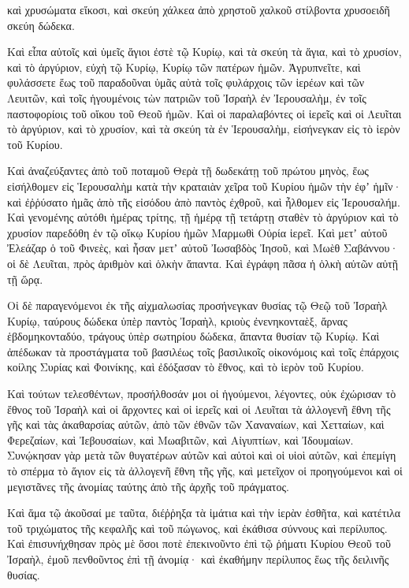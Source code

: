 {καὶ χρυσώματα εἴκοσι, καὶ σκεύη χάλκεα ἀπὸ χρηστοῦ χαλκοῦ στίλβοντα χρυσοειδῆ σκεύη δώδεκα.
\par }{\PP {}Καὶ εἶπα αὐτοῖς καὶ ὑμεῖς ἅγιοι ἐστὲ τῷ Κυρίῳ, καὶ τὰ σκεύη τὰ ἅγια, καὶ τὸ χρυσίον, καὶ τὸ ἀργύριον, εὐχὴ τῷ Κυρίῳ, Κυρίῳ τῶν πατέρων ἡμῶν.
Ἀγρυπνεῖτε, καὶ φυλάσσετε ἕως τοῦ παραδοῦναι ὑμᾶς αὐτὰ τοῖς φυλάρχοις τῶν ἱερέων καὶ τῶν Λευιτῶν, καὶ τοῖς ἡγουμένοις τὼν πατριῶν τοῦ Ἰσραὴλ ἐν Ἰερουσαλὴμ, ἐν τοῖς παστοφορίοις τοῦ οἴκου τοῦ Θεοῦ ἡμῶν.
Καὶ οἱ παραλαβόντες οἱ ἱερεῖς καὶ οἱ Λευῖται τὸ ἀργύριον, καὶ τὸ χρυσίον, καὶ τὰ σκεύη τὰ ἐν Ἱερουσαλὴμ, εἰσήνεγκαν εἰς τὸ ἱερὸν τοῦ Κυρίου.
\par }{\PP {}Καὶ ἀναζεύξαντες ἀπὸ τοῦ ποταμοῦ Θερὰ τῇ δωδεκάτῃ τοῦ πρώτου μηνὸς, ἕως εἰσήλθομεν εἰς Ἱερουσαλὴμ κατὰ τὴν κραταιὰν χεῖρα τοῦ Κυρίου ἡμῶν τὴν ἐφʼ ἡμῖν· καὶ ἐῤῥύσατο ἡμᾶς ἀπὸ τῆς εἰσόδου ἀπὸ παντὸς ἐχθροῦ, καὶ ἦλθομεν εἰς Ἱερουσαλήμ.
Καὶ γενομένης αὐτόθι ἡμέρας τρίτης, τῇ ἡμέρᾳ τῇ τετάρτῃ σταθὲν τὸ ἀργύριον καὶ τὸ χρυσίον παρεδόθη ἐν τῷ οἴκῳ Κυρίου ἡμῶν Μαρμωθὶ Οὐρία ἱερεῖ.
Καὶ μετʼ αὐτοῦ Ἐλεάζαρ ὁ τοῦ Φινεὲς, καὶ ἦσαν μετʼ αὐτοῦ Ἰωσαβδὸς Ἰησοῦ, καὶ Μωὲθ Σαβάννου· οἱ δὲ Λευῖται, πρὸς ἀριθμὸν καὶ ὁλκὴν ἅπαντα.
Καὶ ἐγράφη πᾶσα ἡ ὁλκὴ αὐτῶν αὐτῇ τῇ ὥρᾳ.
\par }{\PP {}Οἱ δὲ παραγενόμενοι ἐκ τῆς αἰχμαλωσίας προσήνεγκαν θυσίας τῷ Θεῷ τοῦ Ἰσραὴλ Κυρίῳ, ταύρους δώδεκα ὑπὲρ παντὸς Ἰσραὴλ,
κριοὺς ἐνενηκονταὲξ, ἄρνας ἑβδομηκονταδύο, τράγους ὑπὲρ σωτηρίου δώδεκα, ἅπαντα θυσίαν τῷ Κυρίῳ.
Καὶ ἀπέδωκαν τὰ προστάγματα τοῦ βασιλέως τοῖς βασιλικοῖς οἰκονόμοις καὶ τοῖς ἐπάρχοις κοίλης Συρίας καὶ Φοινίκης, καὶ ἐδόξασαν τὸ ἔθνος, καὶ τὸ ἱερὸν τοῦ Κυρίου.
\par }{\PP {}Καὶ τούτων τελεσθέντων, προσήλθοσάν μοι οἱ ἡγούμενοι, λέγοντες,
οὐκ ἐχώρισαν τὸ ἔθνος τοῦ Ἰσραὴλ καὶ οἱ ἄρχοντες καὶ οἱ ἱερεῖς καὶ οἱ Λευῖται τὰ ἀλλογενῆ ἔθνη τῆς γῆς καὶ τὰς ἀκαθαρσίας αὐτῶν, ἀπὸ τῶν ἐθνῶν τῶν Χαναναίων, καὶ Χετταίων, καὶ Φερεζαίων, καὶ Ἰεβουσαίων, καὶ Μωαβιτῶν, καὶ Αἰγυπτίων, καὶ Ἰδουμαίων.
Συνῴκησαν γὰρ μετὰ τῶν θυγατέρων αὐτῶν καὶ αὐτοὶ καὶ οἱ υἱοὶ αὐτῶν, καὶ ἐπεμίγη τὸ σπέρμα τὸ ἅγιον εἰς τὰ ἀλλογενῆ ἔθνη τῆς γῆς, καὶ μετεῖχον οἱ προηγούμενοι καὶ οἱ μεγιστᾶνες τῆς ἀνομίας ταύτης ἀπὸ τῆς ἀρχῆς τοῦ πράγματος.
\par }{\PP {}Καὶ ἅμα τῷ ἀκοῦσαί με ταῦτα, διέῤῥηξα τὰ ἱμάτια καὶ τὴν ἱερὰν ἐσθῆτα, καὶ κατέτιλα τοῦ τριχώματος τῆς κεφαλῆς καὶ τοῦ πώγωνος, καὶ ἐκάθισα σύννους καὶ περίλυπος.
Καὶ ἐπισυνήχθησαν πρὸς μὲ ὅσοι ποτὲ ἐπεκινοῦντο ἐπὶ τῷ ῥήματι Κυρίου Θεοῦ τοῦ Ἰσραὴλ, ἐμοῦ πενθοῦντος ἐπὶ τῇ ἀνομίᾳ· καὶ ἐκαθήμην περίλυπος ἕως τῆς δειλινῆς θυσίας.
}
